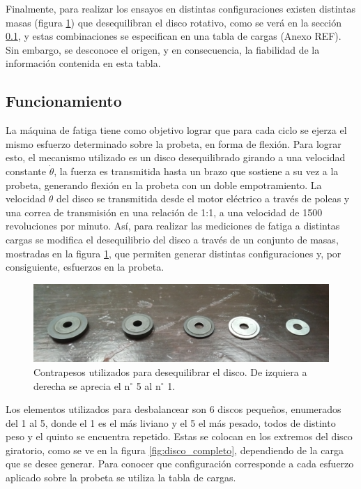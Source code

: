 Finalmente, para realizar los ensayos en distintas configuraciones existen distintas masas (figura \ref{fig:contrapesos}) que desequilibran el disco rotativo, como se verá en la sección \ref{sec:funcionamiento}, y estas combinaciones se especifican en una tabla de cargas (Anexo REF). Sin embargo, se desconoce el origen, y en consecuencia, la fiabilidad de la información contenida en esta tabla.

\subsection{Funcionamiento}
\label{sec:funcionamiento}
La máquina de fatiga tiene como objetivo lograr que para cada ciclo se ejerza el mismo esfuerzo determinado sobre la probeta, en forma de flexión. Para lograr esto, el mecanismo utilizado es un disco desequilibrado girando a una velocidad constante $\dot{\theta}$, la fuerza es transmitida hasta un brazo que sostiene a su vez a la probeta, generando flexión en la probeta con un doble empotramiento. La velocidad $\dot{\theta}$ del disco se transmitida desde el motor eléctrico a través de poleas y una correa de transmisión en una relación de 1:1, a una velocidad de 1500 revoluciones por minuto. Así, para realizar las mediciones de fatiga a distintas cargas se modifica el desequilibrio del disco a través de un conjunto de masas, mostradas en la figura \ref{fig:contrapesos}, que permiten generar distintas configuraciones y, por consiguiente, esfuerzos en la probeta.

\begin{figure}[h]
\centering
\includegraphics[width=1\linewidth]{Imagenes/contrapesos.jpg}
\caption{Contrapesos utilizados para desequilibrar el disco. De izquiera a derecha se aprecia el n$^{\circ}$ 5 al n$^{\circ}$ 1.}
\label{fig:contrapesos}
\end{figure}

Los elementos utilizados para desbalancear son 6 discos pequeños, enumerados del 1 al 5, donde el 1 es el más liviano y el 5 el más pesado, todos de distinto peso y el quinto se encuentra repetido. Estas se colocan en los extremos del disco giratorio, como se ve en la figura \ref{fig:disco_completo}, dependiendo de la carga que se desee generar. Para conocer que configuración corresponde a cada esfuerzo aplicado sobre la probeta se utiliza la tabla de cargas.

